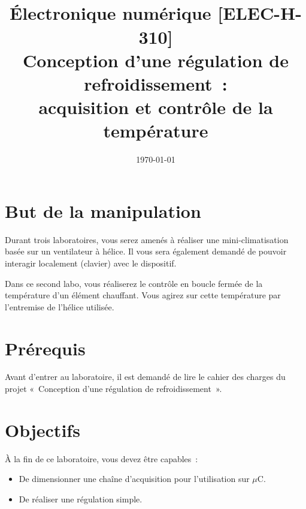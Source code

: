 \documentclass[11pt,a4paper]{article}
\date{\vspace{-1.7cm}\mydate\today}
\title{\vspace{-2cm}\labonumber\\ Électronique numérique [ELEC-H-310]\\Conception d'une régulation de refroidissement~: \\ acquisition et contrôle de la température\ifthenelse{\boolean{corrige}}{~\\Corrigé}{}}
\theoremstyle{definition}%
\begin{document}
\pagestyle{empty}
\maketitle





\section*{But de la manipulation}
Durant trois laboratoires, vous serez amenés à réaliser une mini-climatisation basée sur un ventilateur à hélice.
Il vous sera également demandé de pouvoir interagir localement (clavier) avec le dispositif.

Dans ce second labo, vous réaliserez le contrôle en boucle fermée de la température d’un élément chauffant.
Vous agirez sur cette température par l’entremise de l’hélice utilisée.


\section*{Prérequis}
Avant d’entrer au laboratoire, il est demandé de lire le cahier des charges du projet «~Conception d’une régulation de refroidissement~».


\section*{Objectifs}
À la fin de ce laboratoire, vous devez être capables~:
\begin{itemize}
	\item De dimensionner une chaîne d'acquisition pour l'utilisation sur $\mu$C.
	\item De réaliser une régulation simple.
\end{itemize}


\newpage




\end{document}
